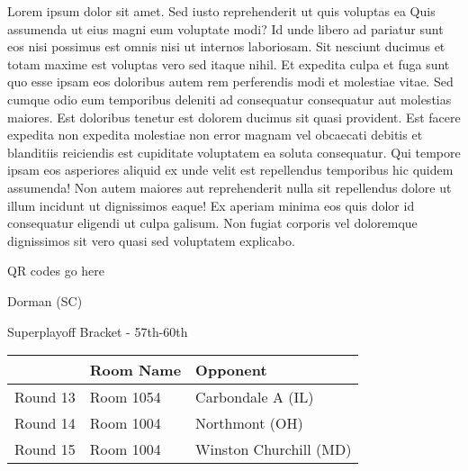 \documentclass{article}%
\begin{document}
\vspace*{8pt}%
\linebreak%
\newline%
\newline%
Lorem ipsum dolor sit amet. Sed iusto reprehenderit ut quis voluptas ea Quis assumenda ut eius magni eum voluptate modi? Id unde libero ad pariatur sunt eos nisi possimus est omnis nisi ut internos laboriosam. Sit nesciunt ducimus et totam maxime est voluptas vero sed itaque nihil. Et expedita culpa et fuga sunt quo esse ipsam eos doloribus autem rem perferendis modi et molestiae vitae.\newline%
\newline%
Sed cumque odio eum temporibus deleniti ad consequatur consequatur aut molestias maiores. Est doloribus tenetur est dolorem ducimus sit quasi provident. Est facere expedita non expedita molestiae non error magnam vel obcaecati debitis et blanditiis reiciendis est cupiditate voluptatem ea soluta consequatur. Qui tempore ipsam eos asperiores aliquid ex unde velit est repellendus temporibus hic quidem assumenda!\newline%
\newline%
Non autem maiores aut reprehenderit nulla sit repellendus dolore ut illum incidunt ut dignissimos eaque! Ex aperiam minima eos quis dolor id consequatur eligendi ut culpa galisum. Non fugiat corporis vel doloremque dignissimos sit vero quasi sed voluptatem explicabo.\newline%
\newline%
%
\vspace*{30pt}%
\begin{center}%
\begin{Huge}%
QR codes go here%
\end{Huge}%
\end{center}%
\newpage%
\begin{center}%
\begin{Huge}%
Dorman (SC)%
\end{Huge}%
\vspace*{8pt}%
\linebreak%
\begin{Large}%
Superplayoff Bracket {-} 57th{-}60th%
\end{Large}%
\end{center}%
%
\begin{tabularx}{\textwidth}{|c|Y|Y|}%
\hline%
&Room Name&Opponent\\%
\hline%
Round 13&Room 1054&Carbondale A (IL)\\%
Round 14&Room 1004&Northmont (OH)\\%
Round 15&Room 1004&Winston Churchill (MD)\\%
\hline%
\end{tabularx}%
\end{document}
